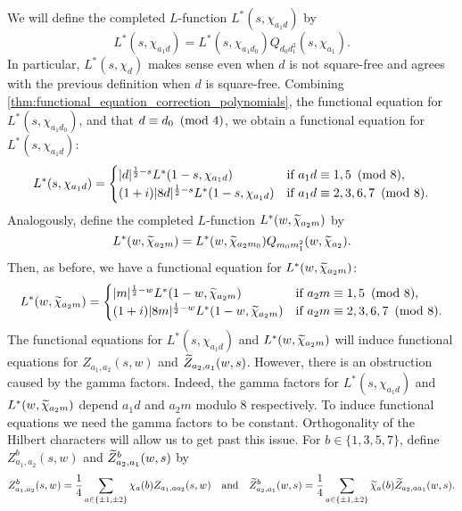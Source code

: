 \documentclass[12pt,reqno,oneside]{amsart}
\begin{document}
    We will define the completed $L$-function $L^{\ast}(s,\chi_{a_{1}d})$ by
    \[
        L^{\ast}(s,\chi_{a_{1}d}) = L^{\ast}(s,\chi_{a_{1}d_{0}})Q_{d_{0}d_{1}^{2}}(s,\chi_{a_{1}}).
    \]
    In particular, $L^{\ast}(s,\chi_{d})$ makes sense even when $d$ is not square-free and agrees with the previous definition when $d$ is square-free. Combining \cref{thm:functional_equation_correction_polynomials}, the functional equation for $L^{\ast}(s,\chi_{a_{1}d_{0}})$, and that $d \equiv d_{0} \ \left(\text{mod }4\right)$, we obtain a functional equation for $L^{\ast}(s,\chi_{a_{1}d})$:
    \[
        L^{\ast}(s,\chi_{a_{1}d}) = \begin{cases} |d|^{\frac{1}{2}-s}L^{\ast}(1-s,\chi_{a_{1}d}) & \text{if $a_{1}d \equiv 1,5 \ \left(\text{mod }8\right)$}, \\ (1+i)|8d|^{\frac{1}{2}-s}L^{\ast}(1-s,\chi_{a_{1}d}) & \text{if $a_{1}d \equiv 2,3,6,7 \ \left(\text{mod }8\right)$}. \end{cases}
    \]
    Analogously, define the completed $L$-function $L^{\ast}(w,\widetilde{\chi}_{a_{2}m})$ by
    \[
        L^{\ast}(w,\widetilde{\chi}_{a_{2}m}) = L^{\ast}(w,\widetilde{\chi}_{a_{2}m_{0}})Q_{m_{0}m_{1}^{2}}(w,\widetilde{\chi}_{a_{2}}).
    \]
    Then, as before, we have a functional equation for $L^{\ast}(w,\widetilde{\chi}_{a_{2}m})$:
    \[
        L^{\ast}(w,\widetilde{\chi}_{a_{2}m}) = \begin{cases} |m|^{\frac{1}{2}-w}L^{\ast}(1-w,\widetilde{\chi}_{a_{2}m}) & \text{if $a_{2}m \equiv 1,5 \ \left(\text{mod }8\right)$}, \\ (1+i)|8m|^{\frac{1}{2}-w}L^{\ast}(1-w,\widetilde{\chi}_{a_{2}m}) & \text{if $a_{2}m \equiv 2,3,6,7 \ \left(\text{mod }8\right)$}. \end{cases}
    \]
    The functional equations for $L^{\ast}(s,\chi_{a_{1}d})$ and $L^{\ast}(w,\widetilde{\chi}_{a_{2}m})$ will induce functional equations for $Z_{a_{1},a_{2}}(s,w)$ and $\widetilde{Z}_{a_{2},a_{1}}(w,s)$. However, there is an obstruction caused by the gamma factors. Indeed, the gamma factors for $L^{\ast}(s,\chi_{a_{1}d})$ and $L^{\ast}(w,\widetilde{\chi}_{a_{2}m})$ depend $a_{1}d$ and $a_{2}m$ modulo $8$ respectively. To induce functional equations we need the gamma factors to be constant. Orthogonality of the Hilbert characters will allow us to get past this issue. For $b \in \{1,3,5,7\}$, define $Z_{a_{1},a_{2}}^{b}(s,w)$ and $\widetilde{Z}_{a_{2},a_{1}}^{b}(w,s)$ by
    \[
        Z_{a_{1},a_{2}}^{b}(s,w) = \frac{1}{4}\sum_{a \in \{\pm1,\pm2\}}\chi_{a}(b)Z_{a_{1},aa_{2}}(s,w) \quad \text{and} \quad \widetilde{Z}_{a_{2},a_{1}}^{b}(w,s) = \frac{1}{4}\sum_{a \in \{\pm1,\pm2\}}\widetilde{\chi}_{a}(b)\widetilde{Z}_{a_{2},aa_{1}}(w,s).
    \]
\end{document}

